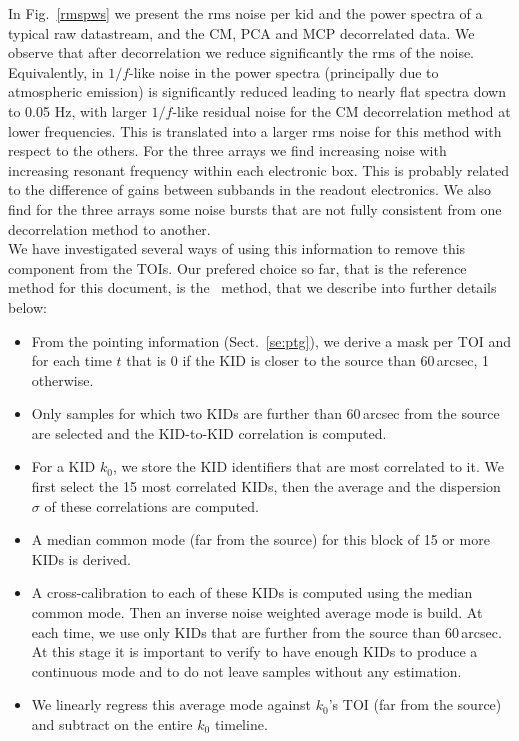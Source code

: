In Fig.~\ref{rmspws} we present the rms noise per kid and the power spectra of
a typical raw datastream, and the CM, PCA and MCP decorrelated data. We observe that after
decorrelation we reduce significantly the rms of the noise. Equivalently, in
$1/f$-like noise in the power spectra (principally due to atmospheric emission)
is significantly reduced leading to nearly flat spectra down to 0.05 Hz, with
larger $1/f$-like residual noise for the CM decorrelation method at lower
frequencies. This is translated into a larger rms noise for this method with
respect to the others. For the three arrays we find increasing noise with
increasing resonant frequency within each electronic box. This is probably
related to the difference of gains between subbands in the readout
electronics. We also find for the three arrays some noise bursts that are not
fully consistent from one decorrelation method to another. \\

We have investigated several ways of using this information to remove this
component from the TOIs. Our prefered choice so far, that is the reference
method for this document, is the \cmoneb\ method, that we describe into further
details below:

\begin{itemize}
\item From the pointing information (Sect.~\ref{se:ptg}), we derive a mask per TOI
  and for each time $t$ that is 0 if the KID is closer to the source than 60\,arcsec, 1
  otherwise.
\item Only samples for which two KIDs are further than 60\,arcsec from
  the source are selected and the KID-to-KID correlation is computed.
\item For a KID $k_0$, we store the KID identifiers that are most
  correlated to it. We first select the 15 most correlated KIDs, then 
  the average and the dispersion $\sigma$ of these correlations are
  computed. 
\item A median common mode (far from the source) for this block of 15 or more KIDs is derived.
\item A cross-calibration to each of these KIDs is computed using the
  median common mode. Then an inverse noise weighted average mode is build. At each time, we use
  only KIDs that are further from the source than 60\,arcsec. At this
  stage it is important to verify to have enough KIDs to produce a
  continuous mode and to do not leave samples without any estimation.
\item We linearly regress this average mode against $k_0$'s TOI (far from the
  source) and subtract on the entire $k_0$ timeline.
\end{itemize}

